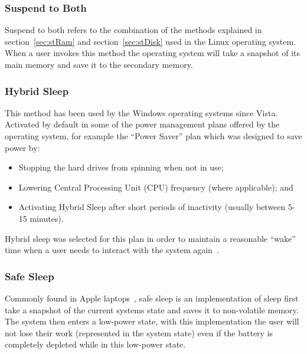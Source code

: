 \documentclass[a4paper,12pt]{article}
\begin{document}
\subsubsection{Suspend to Both}\label{sec:stBoth}
Suspend to both refers to the combination of the methods explained in section~\ref{sec:stRam} and section~\ref{sec:stDisk} used in the Linux operating system. When a user invokes this method the operating system will take a snapshot of its main memory and save it to the secondary memory.
\subsubsection{Hybrid Sleep}\label{sec:hybridsleep}
This method has been used by the Windows operating systems since Vista. Activated by default in some of the power management plans offered by the operating system, for example the ``Power Saver'' plan which was designed to save power by:
\begin{itemize}
    \item{Stopping the hard drives from spinning when not in use;}
    \item{Lowering Central Processing Unit (CPU) frequency (where applicable); and}
    \item{Activating Hybrid Sleep after short periods of inactivity (usually between 5-15 minutes).}
\end{itemize}
Hybrid sleep was selected for this plan in order to maintain a reasonable ``wake'' time when a user needs to interact with the system again~\citep{windowssleepandhibernation}.
\subsubsection{Safe Sleep}\label{sec:safesleep}
Commonly found in Apple laptops~\citep{safesleep}, safe sleep is an implementation of sleep first take a snapshot of the current systems state and saves it to non-volatile memory. The system then enters a low-power state, with this implementation the user will not lose their work (represented in the system state) even if the battery is completely depleted while in this low-power state.
\end{document}
